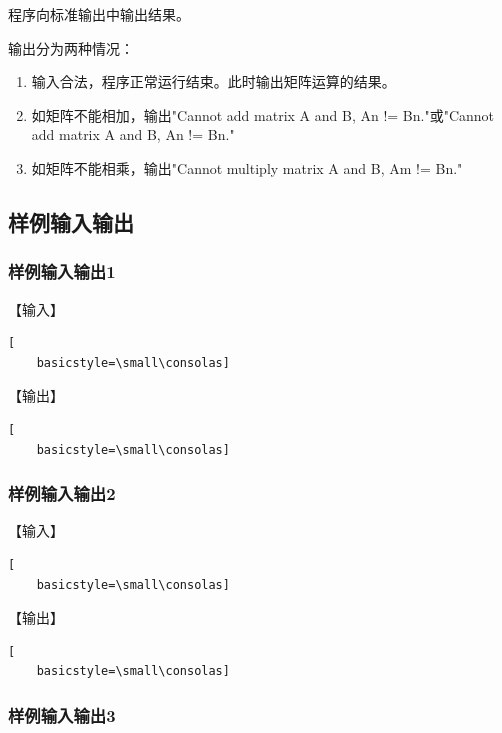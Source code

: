 \documentclass{article}
\begin{document}
程序向标准输出中输出结果。

输出分为两种情况：

\begin{enumerate}
    \item 输入合法，程序正常运行结束。此时输出矩阵运算的结果。
    \item 如矩阵不能相加，输出"Cannot add matrix A and B, An != Bn."或"Cannot add matrix A and B, An != Bn."
    \item 如矩阵不能相乘，输出"Cannot multiply matrix A and B, Am != Bn."
\end{enumerate}

\subsection{样例输入输出}

\subsubsection{样例输入输出1}

【输入】

\begin{lstlisting}[
    basicstyle=\small\consolas]

\end{lstlisting}

【输出】

\begin{lstlisting}[
    basicstyle=\small\consolas]

\end{lstlisting}

\subsubsection{样例输入输出2}

【输入】

\begin{lstlisting}[
    basicstyle=\small\consolas]

\end{lstlisting}

【输出】

\begin{lstlisting}[
    basicstyle=\small\consolas]

\end{lstlisting}

\subsubsection{样例输入输出3}
\end{document}
